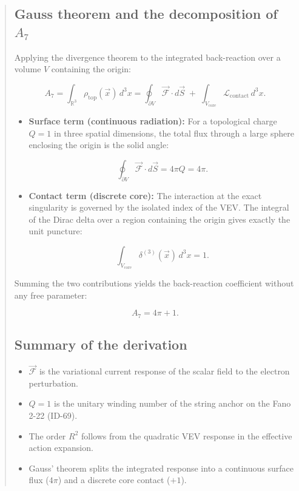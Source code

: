 \documentclass[12pt]{article}
\begin{document}
\begin{abstract}
\subsection{Gauss theorem and the decomposition of \(A_7\)}

Applying the divergence theorem to the integrated back-reaction over a volume \(V\) containing the origin:

\[
A_7 = \int_{\mathbb{R}^3} \rho_{\text{top}}(\vec{x})\,d^3x = \oint_{\partial V} \vec{\mathcal{F}} \cdot d\vec{S} \;+\; \int_{V_{\text{core}}} \mathcal{L}_{\text{contact}}\,d^3x .
\]

\begin{itemize}
  \item \textbf{Surface term (continuous radiation):}  
    For a topological charge \(Q=1\) in three spatial dimensions, the total flux through a large sphere enclosing the origin is the solid angle:

    \[
    \oint_{\partial V} \vec{\mathcal{F}} \cdot d\vec{S} = 4\pi Q = 4\pi .
    \]

  \item \textbf{Contact term (discrete core):}  
    The interaction at the exact singularity is governed by the isolated index of the VEV. The integral of the Dirac delta over a region containing the origin gives exactly the unit puncture:

    \[
    \int_{V_{\text{core}}} \delta^{(3)}(\vec{x})\,d^3x = 1 .
    \]
\end{itemize}

Summing the two contributions yields the back-reaction coefficient without any free parameter:

\[
\boxed{A_7 = 4\pi + 1}.
\]

\subsection{Summary of the derivation}

\begin{itemize}
  \item \(\vec{\mathcal{F}}\) is the variational current response of the scalar field to the electron perturbation.
  \item \(Q = 1\) is the unitary winding number of the string anchor on the Fano 2-22 (ID-69).
  \item The order \(R^2\) follows from the quadratic VEV response in the effective action expansion.
  \item Gauss' theorem splits the integrated response into a continuous surface flux (\(4\pi\)) and a discrete core contact (\(+1\)).
\end{itemize}


\end{abstract}
\end{document}
